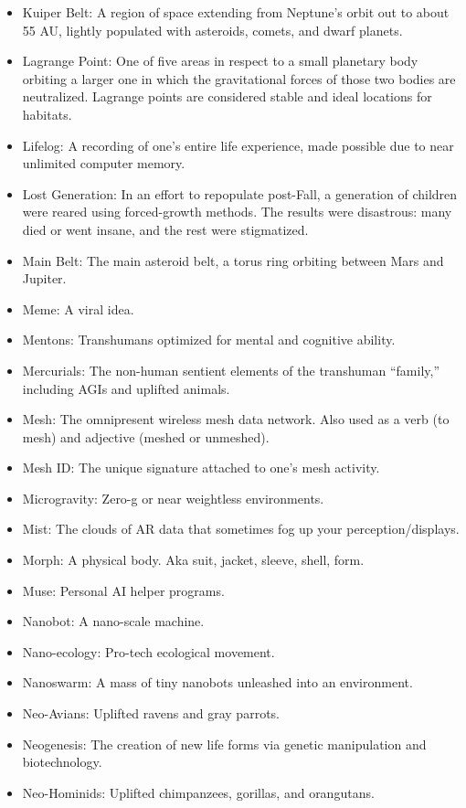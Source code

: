 \begin{itemize}
\item Kuiper Belt: A region of space extending from Neptune's orbit  out to about 55 AU, lightly populated with asteroids, comets, and  dwarf planets.
\item Lagrange Point: One of five areas in respect to a small  planetary body orbiting a larger one in which the gravitational  forces of those two bodies are neutralized. Lagrange points are  considered stable and ideal locations for habitats.
\item Lifelog: A recording of one's entire life experience, made  possible due to near unlimited computer memory.
\item Lost Generation: In an effort to repopulate post-Fall, a  generation of children were reared using forced-growth methods. The  results were disastrous: many died or went insane, and the rest were  stigmatized.
\item Main Belt: The main asteroid belt, a torus ring orbiting between  Mars and Jupiter.
\item Meme: A viral idea.
\item Mentons: Transhumans optimized for mental and cognitive ability.
\item Mercurials: The non-human sentient elements of the transhuman  ``family,'' including AGIs and uplifted animals.
\item Mesh: The omnipresent wireless mesh data network. Also used as  a verb (to mesh) and adjective (meshed or unmeshed).
\item Mesh ID: The unique signature attached to one's mesh activity.
\item Microgravity: Zero-g or near weightless environments.
\item Mist: The clouds of AR data that sometimes fog up your  perception/displays.
\item Morph: A physical body. Aka suit, jacket, sleeve, shell, form.
\item Muse: Personal AI helper programs.
\item Nanobot: A nano-scale machine.
\item Nano-ecology: Pro-tech ecological movement.
\item Nanoswarm: A mass of tiny nanobots unleashed into an  environment.
\item Neo-Avians: Uplifted ravens and gray parrots.
\item Neogenesis: The creation of new life forms via genetic  manipulation and biotechnology.
\item Neo-Hominids: Uplifted chimpanzees, gorillas, and orangutans.

\end{itemize}
